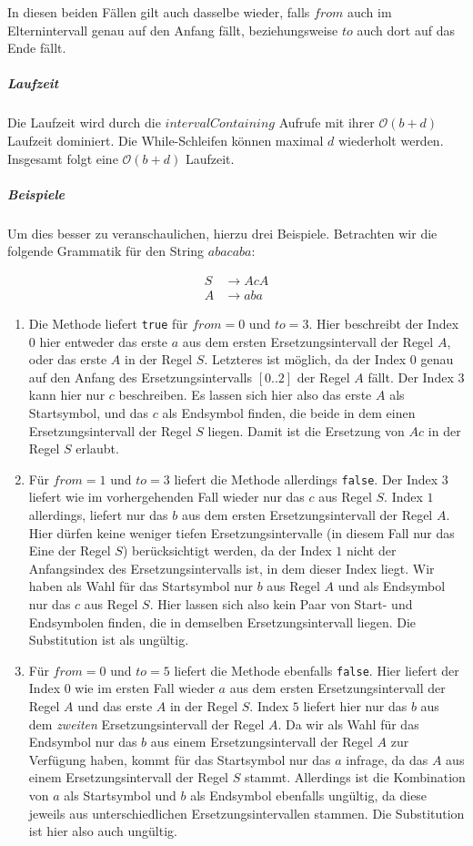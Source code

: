 In diesen beiden Fällen gilt auch dasselbe wieder, falls $from$ auch im Elternintervall genau auf den Anfang fällt, beziehungsweise $to$ auch dort auf das Ende fällt.

\subparagraph{Laufzeit} 
Die Laufzeit wird durch die $intervalContaining$ Aufrufe mit ihrer $\mathcal{O}(b + d)$ Laufzeit dominiert. Die While-Schleifen können maximal $d$ wiederholt werden. Insgesamt folgt eine $\mathcal{O}(b + d)$ Laufzeit. 

\subparagraph{Beispiele}
Um dies besser zu veranschaulichen, hierzu drei Beispiele. Betrachten wir die folgende Grammatik für den String $abacaba$:

\begin{align*}
    S &\rightarrow AcA\\
    A &\rightarrow aba
\end{align*}
\begin{enumerate}
    \item Die Methode liefert \texttt{true} für $from=0$ und $to=3$. Hier beschreibt der Index $0$ hier entweder das erste $a$ aus dem ersten Ersetzungsintervall der Regel $A$, oder das erste $A$ in der Regel $S$. Letzteres ist möglich, da der Index $0$ genau auf den Anfang des Ersetzungsintervalls $[0..2]$ der Regel $A$ fällt. Der Index $3$ kann hier nur $c$ beschreiben.
    Es lassen sich hier also das erste $A$ als Startsymbol, und das $c$ als Endsymbol finden, die beide in dem einen Ersetzungsintervall der Regel $S$ liegen. Damit ist die Ersetzung von $Ac$ in der Regel $S$ erlaubt.
    \item Für $from=1$ und $to=3$ liefert die Methode allerdings \texttt{false}. Der Index $3$ liefert wie im vorhergehenden Fall wieder nur das $c$ aus Regel $S$.
    Index $1$ allerdings, liefert nur das $b$ aus dem ersten Ersetzungsintervall der Regel $A$. Hier dürfen keine weniger tiefen Ersetzungsintervalle (in diesem Fall nur das Eine der Regel $S$) berücksichtigt werden, da der Index $1$ nicht der Anfangsindex des Ersetzungsintervalls ist, in dem dieser Index liegt.
    Wir haben als Wahl für das Startsymbol nur $b$ aus Regel $A$ und als Endsymbol nur das $c$ aus Regel $S$. Hier lassen sich also kein Paar von Start- und Endsymbolen finden, die in demselben Ersetzungsintervall liegen. Die Substitution ist als ungültig.
    \item Für $from=0$ und $to=5$ liefert die Methode ebenfalls \texttt{false}. Hier liefert der Index $0$ wie im ersten Fall wieder $a$ aus dem ersten Ersetzungsintervall der Regel $A$ und das erste $A$ in der Regel $S$. Index $5$ liefert hier nur das $b$ aus dem \emph{zweiten} Ersetzungsintervall der Regel $A$. 
    Da wir als Wahl für das Endsymbol nur das $b$ aus einem Ersetzungsintervall der Regel $A$ zur Verfügung haben, kommt für das Startsymbol nur das $a$ infrage, da das $A$ aus einem Ersetzungsintervall der Regel $S$ stammt.
    Allerdings ist die Kombination von $a$ als Startsymbol und $b$ als Endsymbol ebenfalls ungültig, da diese jeweils aus unterschiedlichen Ersetzungsintervallen stammen.
    Die Substitution ist hier also auch ungültig.
\end{enumerate}

